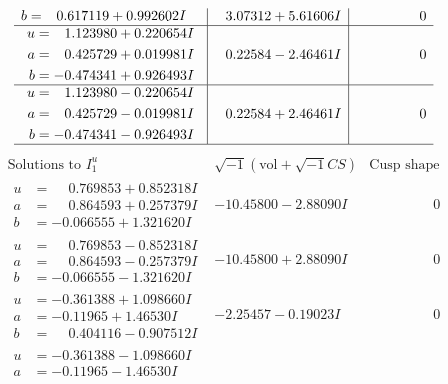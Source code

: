 \documentclass[1p]{elsarticle_modified}
\theoremstyle{definition}
\newcommand{\I}{\sqrt{-1}}
\begin{document}
$$\begin{array}{c|c|c}
\begin{aligned}
b &= \phantom{-}0.617119 + 0.992602 I\end{aligned}
 & \phantom{-}3.07312 + 5.61606 I & \phantom{-0.000000 } 0 \\ \hline\begin{aligned}
u &= \phantom{-}1.123980 + 0.220654 I \\
a &= \phantom{-}0.425729 + 0.019981 I \\
b &= -0.474341 + 0.926493 I\end{aligned}
 & \phantom{-}0.22584 - 2.46461 I & \phantom{-0.000000 } 0 \\ \hline\begin{aligned}
u &= \phantom{-}1.123980 - 0.220654 I \\
a &= \phantom{-}0.425729 - 0.019981 I \\
b &= -0.474341 - 0.926493 I\end{aligned}
 & \phantom{-}0.22584 + 2.46461 I & \phantom{-0.000000 } 0\\
 \hline 
 \end{array}$$\newpage$$\begin{array}{c|c|c}  
\text{Solutions to }I^u_{1}& \I (\text{vol} + \sqrt{-1}CS) & \text{Cusp shape}\\
 \hline 
\begin{aligned}
u &= \phantom{-}0.769853 + 0.852318 I \\
a &= \phantom{-}0.864593 + 0.257379 I \\
b &= -0.066555 + 1.321620 I\end{aligned}
 & -10.45800 - 2.88090 I & \phantom{-0.000000 } 0 \\ \hline\begin{aligned}
u &= \phantom{-}0.769853 - 0.852318 I \\
a &= \phantom{-}0.864593 - 0.257379 I \\
b &= -0.066555 - 1.321620 I\end{aligned}
 & -10.45800 + 2.88090 I & \phantom{-0.000000 } 0 \\ \hline\begin{aligned}
u &= -0.361388 + 1.098660 I \\
a &= -0.11965 + 1.46530 I \\
b &= \phantom{-}0.404116 - 0.907512 I\end{aligned}
 & -2.25457 - 0.19023 I & \phantom{-0.000000 } 0 \\ \hline\begin{aligned}
u &= -0.361388 - 1.098660 I \\
a &= -0.11965 - 1.46530 I \\

\end{aligned}
\end{array}$$
\end{document}
